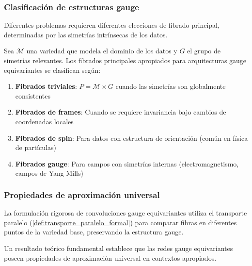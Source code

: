 \subsubsection{Clasificación de estructuras gauge}

Diferentes problemas requieren diferentes elecciones de fibrado principal, determinadas por las simetrías intrínsecas de los datos.

\begin{theorem}
Sea $\mathcal{M}$ una variedad que modela el dominio de los datos y $G$ el grupo de simetrías relevantes. Los fibrados principales apropiados para arquitecturas gauge equivariantes se clasifican según:

\begin{enumerate}
\item \textbf{Fibrados triviales}: $P = \mathcal{M} \times G$ cuando las simetrías son globalmente consistentes
\item \textbf{Fibrados de frames}: Cuando se requiere invariancia bajo cambios de coordenadas locales
\item \textbf{Fibrados de spin}: Para datos con estructura de orientación (común en física de partículas)
\item \textbf{Fibrados gauge}: Para campos con simetrías internas (electromagnetismo, campos de Yang-Mills)
\end{enumerate}
\end{theorem}

\subsubsection{Propiedades de aproximación universal}

La formulación rigorosa de convoluciones gauge equivariantes utiliza el transporte paralelo (\autoref{def:transporte_paralelo_formal}) para comparar fibras en diferentes puntos de la variedad base, preservando la estructura gauge.

Un resultado teórico fundamental establece que las redes gauge equivariantes poseen propiedades de aproximación universal en contextos apropiados.

